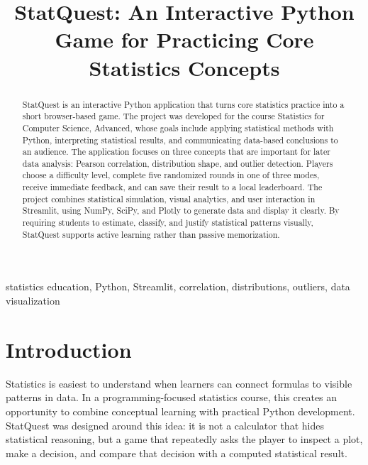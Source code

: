 \documentclass[conference]{IEEEtran}
\begin{document}
\title{StatQuest: An Interactive Python Game for Practicing Core Statistics Concepts}

\author{
\and
{}
}

\maketitle

\begin{abstract}
StatQuest is an interactive Python application that turns core statistics practice into a short browser-based game. The project was developed for the course Statistics for Computer Science, Advanced, whose goals include applying statistical methods with Python, interpreting statistical results, and communicating data-based conclusions to an audience. The application focuses on three concepts that are important for later data analysis: Pearson correlation, distribution shape, and outlier detection. Players choose a difficulty level, complete five randomized rounds in one of three modes, receive immediate feedback, and can save their result to a local leaderboard. The project combines statistical simulation, visual analytics, and user interaction in Streamlit, using NumPy, SciPy, and Plotly to generate data and display it clearly. By requiring students to estimate, classify, and justify statistical patterns visually, StatQuest supports active learning rather than passive memorization.
\end{abstract}

\begin{IEEEkeywords}
statistics education, Python, Streamlit, correlation, distributions, outliers, data visualization
\end{IEEEkeywords}

\section{Introduction}
Statistics is easiest to understand when learners can connect formulas to visible patterns in data. In a programming-focused statistics course, this creates an opportunity to combine conceptual learning with practical Python development. StatQuest was designed around this idea: it is not a calculator that hides statistical reasoning, but a game that repeatedly asks the player to inspect a plot, make a decision, and compare that decision with a computed statistical result.
\end{document}
